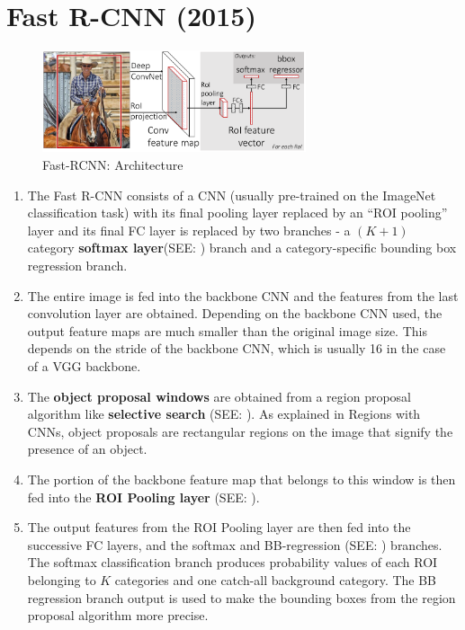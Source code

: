 \section{Fast R-CNN (2015) \cite{arxiv/1504.08083-fast-rcnn,medium/towardsdatascience.com/fast-r-cnn-for-object-detection-a-technical-summary-a0ff94faa022}}\label{Fast R-CNN}

\begin{figure}[h]
    \centering
    \includegraphics[width=\linewidth, height=3cm, keepaspectratio]{Pictures/convolutional-neural-network/fast-rcnn-arch.png}
    \caption{Fast-RCNN: Architecture \cite{arxiv/1504.08083-fast-rcnn}}
\end{figure}

\begin{enumerate}
    \item The Fast R-CNN consists of a CNN (usually pre-trained on the ImageNet classification task) with its final pooling layer replaced by an “ROI pooling” layer and its final FC layer is replaced by two branches - a $(K + 1)$ category \textbf{softmax layer}(SEE: ) branch and a category-specific bounding box regression branch.

    \item The entire image is fed into the backbone CNN and the features from the last convolution layer are obtained. Depending on the backbone CNN used, the output feature maps are much smaller than the original image size. This depends on the stride of the backbone CNN, which is usually 16 in the case of a VGG backbone.

    \item The \textbf{object proposal windows} are obtained from a region proposal algorithm like \textbf{selective search} (SEE: ). As explained in Regions with CNNs, object proposals are rectangular regions on the image that signify the presence of an object.

    \item The portion of the backbone feature map that belongs to this window is then fed into the \textbf{ROI Pooling layer} (SEE: ).

    \item The output features from the ROI Pooling layer are then fed into the successive FC layers, and the softmax and BB-regression (SEE: ) branches. The softmax classification branch produces probability values of each ROI belonging to $K$ categories and one catch-all background category. The BB regression branch output is used to make the bounding boxes from the region proposal algorithm more precise.
\end{enumerate}

